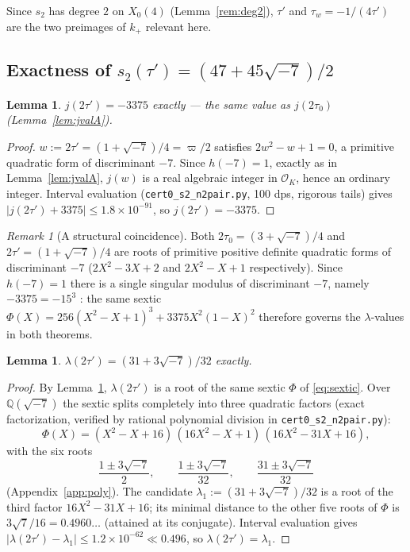 \documentclass[11pt]{article}
\newtheorem{lemma}[theorem]{Lemma}
\theoremstyle{definition}
\theoremstyle{remark}
\newtheorem{remark}[theorem]{Remark}
\newcommand{\Qq}{\mathbb{Q}}
\newcommand{\OO}{\mathcal{O}}
\begin{document}
Since $s_2$ has degree $2$ on $X_0(4)$ (Lemma~\ref{rem:deg2}), $\tau'$
and $\tau_w=-1/(4\tau')$ are the two preimages of $k_+$ relevant here.

\subsection{Exactness of \texorpdfstring{$s_2(\tau')=(47+45\sqrt{-7})/2$}{s2(tau')=(47+45 sqrt(-7))/2}}\label{subsec:exactB}

\begin{lemma}\label{lem:jvalB}
$j(2\tau')=-3375$ exactly --- the same value as $j(2\tau_0)$
\textup{(}Lemma~\ref{lem:jvalA}\textup{)}.
\end{lemma}
\begin{proof}
$w:=2\tau'=(1+\sqrt{-7})/4=\varpi/2$ satisfies $2w^2-w+1=0$, a primitive
quadratic form of discriminant $-7$. Since $h(-7)=1$, exactly as in
Lemma~\ref{lem:jvalA}, $j(w)$ is a real algebraic integer in $\OO_K$,
hence an ordinary integer. Interval evaluation
(\texttt{cert0\_s2\_n2pair.py}, 100 dps, rigorous tails) gives
$|j(2\tau')+3375|\le1.8\times10^{-91}$, so $j(2\tau')=-3375$.
\end{proof}

\begin{remark}[A structural coincidence]\label{rem:structural}
Both $2\tau_0=(3+\sqrt{-7})/4$ and $2\tau'=(1+\sqrt{-7})/4$ are roots of
primitive positive definite quadratic forms of discriminant $-7$
($2X^2-3X+2$ and $2X^2-X+1$ respectively). Since $h(-7)=1$ there is a
single singular modulus of discriminant $-7$, namely $-3375=-15^3$
\cite{We,Cox}: the same sextic
$\Phi(X)=256(X^2-X+1)^3+3375X^2(1-X)^2$ therefore governs the
$\lambda$-values in both theorems.
\end{remark}

\begin{lemma}\label{lem:lamvalB}
$\lambda(2\tau')=(31+3\sqrt{-7})/32$ exactly.
\end{lemma}
\begin{proof}
By Lemma~\ref{lem:jvalB}, $\lambda(2\tau')$ is a root of the same sextic
$\Phi$ of \eqref{eq:sextic}. Over $\Qq(\sqrt{-7})$ the sextic splits
completely into three quadratic factors (exact factorization, verified by
rational polynomial division in \texttt{cert0\_s2\_n2pair.py}):
\begin{equation}\label{eq:sexticB}
  \Phi(X)=(X^2-X+16)\,(16X^2-X+1)\,(16X^2-31X+16),
\end{equation}
with the six roots
\[
  \frac{1\pm3\sqrt{-7}}2,\qquad
  \frac{1\pm3\sqrt{-7}}{32},\qquad
  \frac{31\pm3\sqrt{-7}}{32}
\]
(Appendix~\ref{app:poly}). The candidate
$\lambda_1:=(31+3\sqrt{-7})/32$ is a root of the third factor
$16X^2-31X+16$; its minimal distance to the other five roots of $\Phi$ is
$3\sqrt7/16=0.4960\ldots$ (attained at its conjugate). Interval evaluation
gives $|\lambda(2\tau')-\lambda_1|\le1.2\times10^{-62}\ll0.496$, so
$\lambda(2\tau')=\lambda_1$.
\end{proof}
\end{document}
